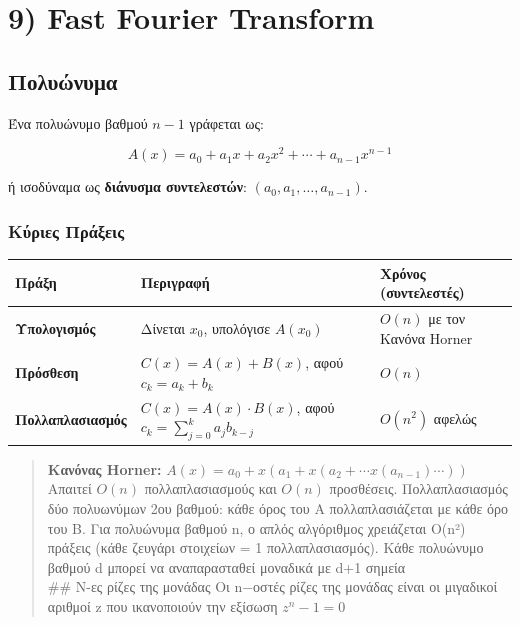 \documentclass[
  a4paper,
  11pt,
]{article}
\begin{document}
\section{9) Fast Fourier Transform}\label{fast-fourier-transform}

\subsection{Πολυώνυμα}\label{ux3c0ux3bfux3bbux3c5ux3ceux3bdux3c5ux3bcux3b1}

Ένα πολυώνυμο βαθμού \(n-1\) γράφεται ως:

\[A(x) = a_0 + a_1 x + a_2 x^2 + \cdots + a_{n-1} x^{n-1}\]

ή ισοδύναμα ως \textbf{διάνυσμα συντελεστών}:
\((a_0, a_1, \ldots, a_{n-1})\).

\subsubsection{Κύριες
Πράξεις}\label{ux3baux3cdux3c1ux3b9ux3b5ux3c2-ux3c0ux3c1ux3acux3beux3b5ux3b9ux3c2}

\begin{longtable}[]{@{}
  >{\raggedright\arraybackslash}p{}
  >{\raggedright\arraybackslash}p{}
  >{\raggedright\arraybackslash}p{}@{}}
\toprule\noalign{}
\begin{minipage}[b]{\linewidth}\raggedright
Πράξη
\end{minipage} & \begin{minipage}[b]{\linewidth}\raggedright
Περιγραφή
\end{minipage} & \begin{minipage}[b]{\linewidth}\raggedright
Χρόνος (συντελεστές)
\end{minipage} \\
\midrule\noalign{}
\endhead
\bottomrule\noalign{}
\endlastfoot
\textbf{Υπολογισμός} & Δίνεται \(x_0\), υπολόγισε \(A(x_0)\) & \(O(n)\)
με τον Κανόνα Horner \\
\textbf{Πρόσθεση} & \(C(x) = A(x) + B(x)\), αφού \(c_k = a_k + b_k\) &
\(O(n)\) \\
\textbf{Πολλαπλασιασμός} & \(C(x) = A(x) \cdot B(x)\), αφού
\(c_k = \sum_{j=0}^{k} a_j b_{k-j}\) & \(O(n^2)\) αφελώς \\
\end{longtable}

\begin{quote}
\textbf{Κανόνας Horner:}
\(A(x) = a_0 + x(a_1 + x(a_2 + \cdots x(a_{n-1})\cdots))\)\\
Απαιτεί \(O(n)\) πολλαπλασιασμούς και \(O(n)\) προσθέσεις.
Πολλαπλασιασμός δύο πολυωνύμων 2ου βαθμού: κάθε όρος του A
πολλαπλασιάζεται με κάθε όρο του B. Για πολυώνυμα βαθμού n, ο απλός
αλγόριθμος χρειάζεται O(n²) πράξεις (κάθε ζευγάρι στοιχείων = 1
πολλαπλασιασμός). Κάθε πολυώνυμο βαθμού d μπορεί να αναπαρασταθεί
μοναδικά με d+1 σημεία\\
\#\# N-ες ρίζες της μονάδας Οι n−οστές ρίζες της μονάδας είναι οι
μιγαδικοί αριθμοί z που ικανοποιούν την εξίσωση \(z^n-1=0\)
\end{quote}
\end{document}
